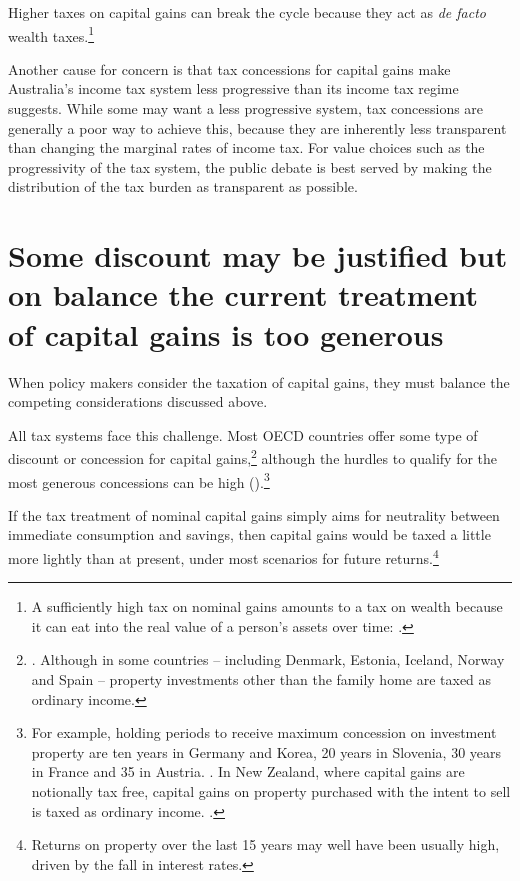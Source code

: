 Higher taxes on capital gains can break the cycle because they act as \emph{de facto} wealth taxes.\footnote{A sufficiently high tax on nominal gains amounts to a tax on wealth because it can eat into the real value of a person's assets over time: \textcite{Cowen2013}.}

Another cause for concern is that tax concessions for capital gains make Australia’s income tax system less progressive than its income tax regime suggests. While some may want a less progressive system, tax concessions are generally a poor way to achieve this, because they are inherently less transparent than changing the marginal rates of income tax. For value choices such as the progressivity of the tax system, the public debate is best served by making the distribution of the tax burden as transparent as possible. %

\section{Some discount may be justified but on balance the current treatment of capital gains is too generous}
When policy makers consider the taxation of capital gains, they must balance the competing considerations discussed above. 

All tax systems face this challenge. Most OECD countries offer some type of discount or concession for capital gains,\footnote{\textcite{Harding2013}. Although in some countries – including Denmark, Estonia, Iceland, Norway and Spain – property investments other than the family home are taxed as ordinary income.} although the hurdles to qualify for the most generous concessions can be high ().\footnote{For example, holding periods to receive maximum concession on investment property are ten years in Germany and Korea, 20 years in Slovenia, 30 years in France and 35 in Austria. \textcite[See:][]{Harding2013}. In New Zealand, where capital gains are notionally tax free, capital gains on property purchased with the intent to sell is taxed as ordinary income. \textcite[][See:]{InlandRevenueNewZealand2015MistakingPropertyDealingForPropertyInvestment}.} 

If the tax treatment of nominal capital gains simply aims for neutrality between immediate consumption and savings, then capital gains would be taxed a little more lightly than at present, under most scenarios for future returns.\footnote{Returns on property over the last 15 years may well have been usually high, driven by the fall in interest rates.} 

